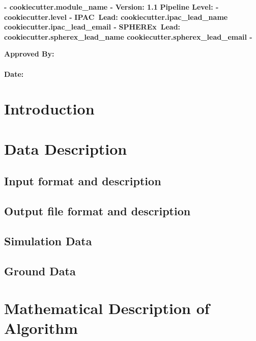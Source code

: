 \documentclass{article}
\newcommand{\spherex}{SPHEREx}
\newcommand{\ipac}{IPAC}
\newcommand{\modulename}{ {{- cookiecutter.module_name -}} }
\newcommand{\pipelevel}{ {{- cookiecutter.level -}} }
\newcommand{\version}{1.1}
\begin{document}
\begin{center}
{\Huge\bf\modulename}
\vskip 0.25in
{\LARGE\bf Version: \version}
\vskip 0.25in
{\LARGE\noindent\bf Pipeline Level:\pipelevel} 
\vskip 0.25in
{\noindent\bf \ipac\ Lead: {{ cookiecutter.ipac_lead_name }} {{ cookiecutter.ipac_lead_email -}} }   
\vskip 0.125in
{\noindent\bf \spherex\ Lead: {{ cookiecutter.spherex_lead_name }} {{ cookiecutter.spherex_lead_email -}} } 
\vskip 0.125in
\end{center}


\vskip 0.25in

{\LARGE\noindent\bf Approved By: \\ \\}
{\LARGE\noindent\bf Date:}\\ 
\vskip 0.25in

\tableofcontents

\newpage

\section{Introduction}

\section{Data Description}

\subsection{Input format and description}

\subsection{Output file format and description}

\subsection{Simulation Data}

\subsection{Ground Data}

\section{Mathematical Description of Algorithm}
\end{document}
